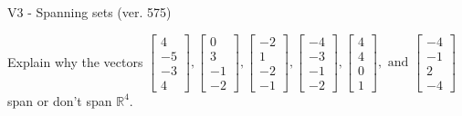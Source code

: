 \begin{exercise}
  \begin{exerciseTitle}V3 - Spanning sets (ver. 575)\end{exerciseTitle}
  \begin{exerciseStatement}
    Explain why the vectors \(\left[\begin{array}{r}
4 \\
-5 \\
-3 \\
4
\end{array}\right] , \left[\begin{array}{r}
0 \\
3 \\
-1 \\
-2
\end{array}\right] , \left[\begin{array}{r}
-2 \\
1 \\
-2 \\
-1
\end{array}\right] , \left[\begin{array}{r}
-4 \\
-3 \\
-1 \\
-2
\end{array}\right] , \left[\begin{array}{r}
4 \\
4 \\
0 \\
1
\end{array}\right] , \text{ and } \left[\begin{array}{r}
-4 \\
-1 \\
2 \\
-4
\end{array}\right]\) span or don't span \(\mathbb{R}^4\). 
	



\end{exerciseStatement}
\end{exercise}
